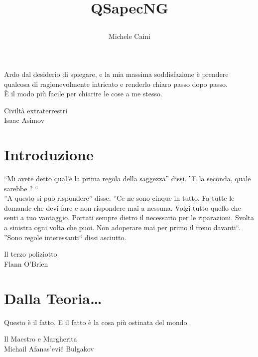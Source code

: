 \documentclass[10pt,a4paper,cleardoubleempty]{scrbook}
\title{\begin{huge}\bfseries QSapecNG\end{huge}}
\author{Michele Caini}
\begin{document}


\cleardoublepage
\null{}\begin{flushright}
\setlength{\epigraphwidth}{21em}
\epigraph{
Ardo dal desiderio di spiegare, e la mia massima soddisfazione è prendere qualcosa di ragionevolmente intricato e renderlo chiaro passo dopo passo.\\
È il modo più facile per chiarire le cose a me stesso.
}{Civiltà extraterrestri\\ Isaac Asimov}
\end{flushright}\null

\cleardoublepage
\tableofcontents


\cleardoublepage
\part{Introduzione}

\thispagestyle{empty}
\null{}
\begin{flushright}
\setlength{\epigraphwidth}{21em}
\epigraph{
\footnotesize{``Mi avete detto qual'è la prima regola della saggezza'' dissi. ''E la seconda, quale sarebbe ? ``\\
''A questo si può rispondere'' disse. ''Ce ne sono cinque in tutto. Fa tutte le domande che devi fare e non rispondere mai a nessuna. Volgi tutto quello che senti a tuo vantaggio. Portati sempre dietro il necessario per le riparazioni. Svolta a sinistra ogni volta che puoi. Non adoperare mai per primo il freno davanti``.\\
''Sono regole interessanti`` dissi asciutto.}
}{\footnotesize{Il terzo poliziotto\\ Flann O'Brien}}
\end{flushright}\null




\cleardoublepage
\part{Dalla Teoria\ldots}

\thispagestyle{empty}
\null{}\begin{flushright}
\setlength{\epigraphwidth}{21em}
\epigraph{
\footnotesize{Questo è il fatto. E il fatto è la cosa più ostinata del mondo.}
}{\footnotesize{Il Maestro e Margherita\\ Michail Afanas'evi\u{c} Bulgakov}}
\end{flushright}\null
\end{document}
